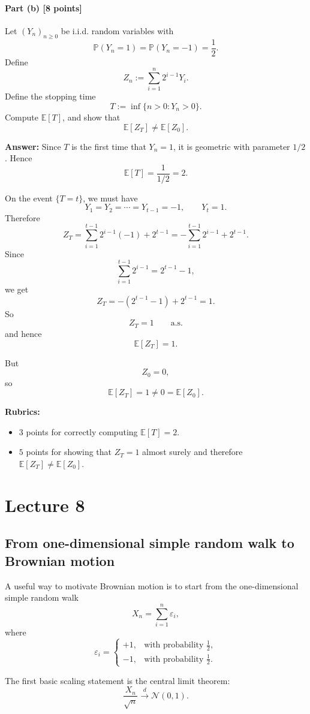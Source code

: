 \documentclass[11pt]{article}
\theoremstyle{definition}
\begin{document}
\paragraph{Part (b) \hfill [8 points]}
Let \((Y_n)_{n\ge 0}\) be i.i.d. random variables with
\[
\mathbb P(Y_n=1)=\mathbb P(Y_n=-1)=\frac12.
\]
Define
\[
Z_n:=\sum_{i=1}^n 2^{i-1}Y_i.
\]
Define the stopping time
\[
T:=\inf\{n>0:Y_n>0\}.
\]
Compute \(\mathbb E[T]\), and show that
\[
\mathbb E[Z_T]\ne \mathbb E[Z_0].
\]

\textbf{Answer:}
Since \(T\) is the first time that \(Y_n=1\), it is geometric with parameter \(1/2\). Hence
\[
\mathbb E[T]=\frac{1}{1/2}=2.
\]

On the event \(\{T=t\}\), we must have
\[
Y_1=Y_2=\cdots=Y_{t-1}=-1,
\qquad
Y_t=1.
\]
Therefore
\[
Z_T
=
\sum_{i=1}^{t-1}2^{i-1}(-1)+2^{t-1}
=
-\sum_{i=1}^{t-1}2^{i-1}+2^{t-1}.
\]
Since
\[
\sum_{i=1}^{t-1}2^{i-1}=2^{t-1}-1,
\]
we get
\[
Z_T=-(2^{t-1}-1)+2^{t-1}=1.
\]
So
\[
Z_T=1
\qquad \text{a.s.}
\]
and hence
\[
\mathbb E[Z_T]=1.
\]

But
\[
Z_0=0,
\]
so
\[
\mathbb E[Z_T]=1\ne 0=\mathbb E[Z_0].
\]

\textbf{Rubrics:}
\begin{itemize}[leftmargin=2em]
    \item \(3\) points for correctly computing \(\mathbb E[T]=2\).
    \item \(5\) points for showing that \(Z_T=1\) almost surely and therefore \(\mathbb E[Z_T]\ne \mathbb E[Z_0]\).
\end{itemize}

\clearpage
\section{Lecture 8}

\subsection{From one-dimensional simple random walk to Brownian motion}

A useful way to motivate Brownian motion is to start from the one-dimensional simple random walk
\[
X_n=\sum_{i=1}^n \varepsilon_i,
\]
where
\[
\varepsilon_i=
\begin{cases}
+1, & \text{with probability } \frac12,\\[0.3em]
-1, & \text{with probability } \frac12.
\end{cases}
\]

The first basic scaling statement is the central limit theorem:
\[
\frac{X_n}{\sqrt n}\xrightarrow{d}\mathcal N(0,1).
\]
\end{document}
